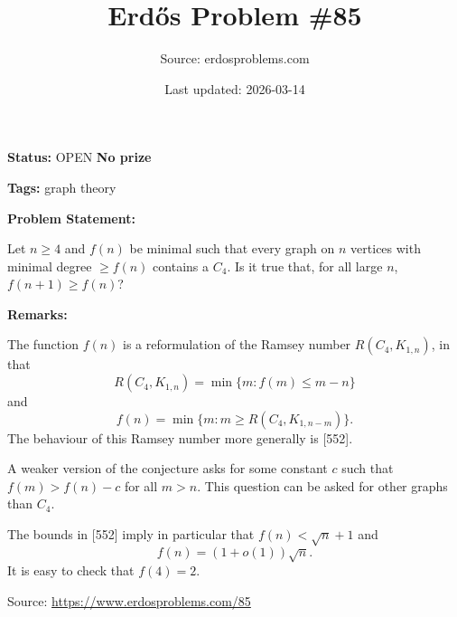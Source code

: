 \documentclass{article}
\title{Erd\H{o}s Problem \#85}
\date{Last updated: 2026-03-14}
\author{Source: erdosproblems.com}
\begin{document}
\maketitle

\noindent\textbf{Status:} OPEN \quad \textbf{No prize}

\noindent\textbf{Tags:} graph theory

\medskip
\noindent\textbf{Problem Statement:}

Let $n\geq 4$ and $f(n)$ be minimal such that every graph on $n$ vertices with minimal degree $\geq f(n)$ contains a $C_4$. Is it true that, for all large $n$, $f(n+1)\geq f(n)$?

\bigskip
\noindent\textbf{Remarks:}

The function $f(n)$ is a reformulation of the Ramsey number $R(C_4,K_{1,n})$, in that\[R(C_4,K_{1,n})=\min\{ m : f(m)\leq m-n\}\]and\[f(n)=\min\{ m : m\geq R(C_4, K_{1,n-m})\}.\]The behaviour of this Ramsey number more generally is [552].

A weaker version of the conjecture asks for some constant $c$ such that $f(m)>f(n)-c$ for all $m>n$. This question can be asked for other graphs than $C_4$.

The bounds in [552] imply in particular that $f(n)<\sqrt{n}+1$ and\[f(n)=(1+o(1))\sqrt{n}.\]It is easy to check that $f(4)=2$.

\bigskip
\noindent\small{Source: \url{https://www.erdosproblems.com/85}}
\end{document}

